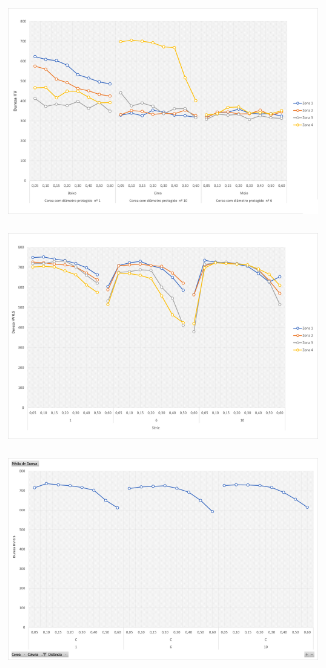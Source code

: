 \begin{figure}[htb]
    \centering
    \begin{subfigure}{.4\textwidth}
        \centering
        \includegraphics[width = 0.9\textwidth]{Figures/Cap4/Grafico_4_Zonas_P_inicial.png}
        \caption[]%
        {}
        \label{fig:resultados_Tampa_P_inicial}
    \end{subfigure}%
    \begin{subfigure}{.4\textwidth}
        \centering
        \includegraphics[width = 0.9\textwidth]{Figures/Cap4/Grafico_4_Zonas_S_inicial.png}
        \caption{}
        \label{fig:resultados_Serie_inicial}
    \end{subfigure}
    \begin{subfigure}{.4\textwidth}
        \centering
        \includegraphics[width = 0.9\textwidth]{Figures/Cap4/Grafico_4_Zonas_P_inicial_dentado.png}

\end{subfigure}
\end{figure}
